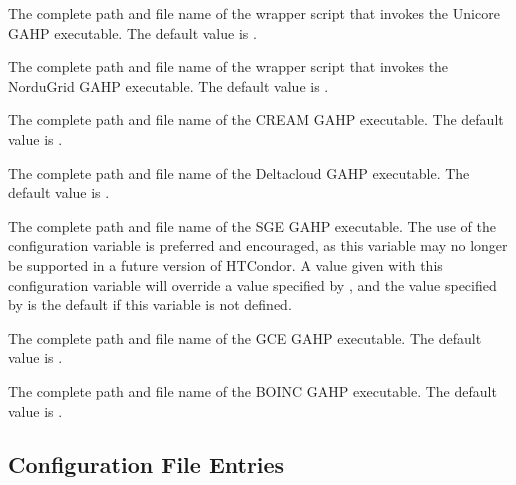 \begin{description}
\label{param:UnicoreGAHP}
\item[\Macro{UNICORE\_GAHP}]
  The complete path and file name of the
  wrapper script that invokes the Unicore GAHP executable.
  The default value is .

\label{param:NorduGridGAHP}
\item[\Macro{NORDUGRID\_GAHP}]
  The complete path and file name of the
  wrapper script that invokes the NorduGrid GAHP executable.
  The default value is .

\label{param:CREAMGAHP}
\item[\Macro{CREAM\_GAHP}]
  The complete path and file name of the CREAM GAHP executable.
  The default value is .

\label{param:DeltacloudGAHP}
\item[\Macro{DELTACLOUD\_GAHP}]
  The complete path and file name of the Deltacloud GAHP executable.
  The default value is .

\label{param:SGEGAHP}
\item[\Macro{SGE\_GAHP}]
  The complete path and file name of the SGE GAHP executable.
  The use of the configuration variable 
  is preferred and encouraged,
  as this variable may no longer be supported in a future
  version of HTCondor.
  A value given with this configuration variable will override
  a value specified by ,
  and the value specified by  is the default
  if this variable is not defined.

\label{param:GCEGAHP}
\item[\Macro{GCE\_GAHP}]
  The complete path and file name of the GCE GAHP executable.
  The default value is .

\label{param:BOINCGAHP}
\item[\Macro{BOINC\_GAHP}]
  The complete path and file name of the BOINC GAHP executable.
  The default value is .

\end{description}

\subsection{\label{sec:JobRouter-Config-File-Entries}
Configuration File Entries}

